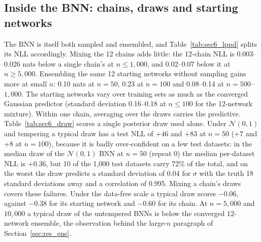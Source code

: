 \documentclass[11pt]{article}
\begin{document}
\begin{table}[p]
\centering
\footnotesize\setlength{\tabcolsep}{2pt}
\caption{Paired differences in test NLL (nats), $A-B$ per repeat, mean $\pm$ sd over repeats (20 at $n\le100$, 5 above); negative: $A$ is better. Below each difference: repeats in which $A$ is better ($k/R$), the two-sided paired $t$-test $p$, and at $n\le100$ the two-sided Wilcoxon signed-rank $p$ (W; with 5 repeats its smallest attainable $p$ is 0.0625, so it is not shown). Bold: $t$-test $p<0.05$. $^\dagger$: the Wilcoxon test disagrees about $p<0.05$. Gaussian predictor: conv.\ = trained to convergence, capped = MILE's pretraining budget, the BNN's own start; 12 / 1: ensemble / member 0. Part 2: the BNN against its own capped starting networks, ensembling, the unsampled baselines against each other, and the BNN variants; empirical Bayes is compared with its fixed-scale control on the same re-tuning sampler.}
\label{tab:paired_b}

\end{table}

\subsection{Inside the BNN: chains, draws and starting networks}
\label{app:inside}
The BNN is itself both sampled and ensembled, and Table~\ref{tab:sec6_lppd} splits its NLL accordingly. Mixing the 12 chains adds little: the 12-chain NLL is 0.003--0.026 nats below a single
chain's at $n\le1{,}000$, and 0.02--0.07 below it at $n\ge5{,}000$. Ensembling the same 12 starting networks without
sampling gains more at small $n$: 0.10 nats at $n=50$, 0.23 at $n=100$ and 0.08--0.14 at $n=500$--$1{,}000$. The
starting networks vary over training sets as much as the converged Gaussian predictor (standard deviation 0.16--0.18 at
$n\le100$ for the 12-network mixture). Within one chain, averaging over the draws carries the predictive.
Table~\ref{tab:sec6_draw} scores a single posterior draw used alone. Under $\mathcal N(0,1)$ and tempering a typical
draw has a test NLL of $+46$ and $+83$ at $n=50$ ($+7$ and $+8$ at $n=100$), because it is badly over-confident on a few
test datasets: in the median draw of the $\mathcal N(0,1)$ BNN at $n=50$ (repeat 0) the median per-dataset NLL is
$+0.36$, but 10 of the 1{,}000 test datasets carry 72\% of the total, and on the worst the draw predicts a standard
deviation of 0.04 for $\sigma$ with the truth 18 standard deviations away and a correlation of 0.995. Mixing a chain's
draws covers these failures. Under the data-free scale a typical draw scores $-0.06$, against $-0.38$ for its starting
network and $-0.60$ for its chain. At $n=5{,}000$ and $10{,}000$ a typical draw of the untempered BNNs is below the
converged 12-network ensemble, the observation behind the large-$n$ paragraph of Section~\ref{sec:res_ens}.
\end{document}

